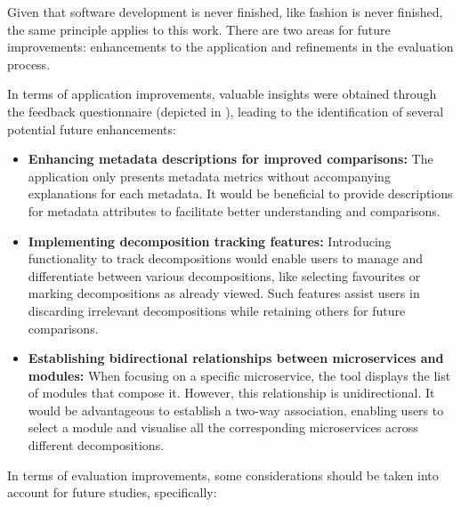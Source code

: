 Given that software development is never finished, like fashion is never
finished, the same principle applies to this work. There are two areas for
future improvements: enhancements to the application and refinements in the
evaluation process.

In terms of application improvements, valuable insights were obtained through
the feedback questionnaire (depicted in ),
leading to the identification of several potential future enhancements:

\begin{itemize}
  \item \textbf{Enhancing metadata descriptions for improved comparisons:} The
    application only presents metadata metrics without accompanying
    explanations for each metadata. It would be beneficial to provide
    descriptions for metadata attributes to facilitate better understanding and
    comparisons.

  \item \textbf{Implementing decomposition tracking features:} Introducing
    functionality to track decompositions would enable users to manage and
    differentiate between various decompositions, like selecting favourites or
    marking decompositions as already viewed. Such features assist users in
    discarding irrelevant decompositions while retaining others for future
    comparisons.

  \item \textbf{Establishing bidirectional relationships between microservices
    and modules:} When focusing on a specific microservice, the tool displays
    the list of modules that compose it. However, this relationship is
    unidirectional. It would be advantageous to establish a two-way
    association, enabling users to select a module and visualise all the
    corresponding microservices across different decompositions.
\end{itemize}

In terms of evaluation improvements, some considerations should be taken into
account for future studies, specifically:


